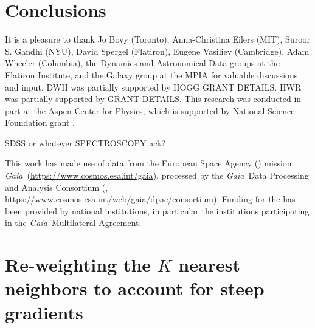 \documentclass[modern]{aastex63}
\newcommand{\gaia}{\textsl{Gaia}}
\newcommand{\apogee}{\acronym{APOGEE}}
\newcommand{\sdss}{\acronym{SDSS}}
\begin{document}

\section{Conclusions}
\label{sec:conclusions}



\acknowledgments
It is a pleasure to thank
  Jo Bovy (Toronto),
  Anna-Christina Eilers (MIT),
  Suroor S. Gandhi (NYU),
  David Spergel (Flatiron),
  Eugene Vasiliev (Cambridge),
  Adam Wheeler (Columbia),
  the Dynamics and Astronomical Data groups at the Flatiron Institute,
  and the Galaxy group at the MPIA
for valuable discussions and input.
DWH was partially supported by HOGG GRANT DETAILS.
HWR was partially supported by GRANT DETAILS.
This research was conducted in part at the Aspen Center for Physics,
which is supported by National Science Foundation grant .

SDSS or whatever SPECTROSCOPY ack?

This work has made use of data from the European Space Agency ()
mission \gaia\ (\url{https://www.cosmos.esa.int/gaia}), processed by the \gaia\
Data Processing and Analysis Consortium (,
\url{https://www.cosmos.esa.int/web/gaia/dpac/consortium}). Funding for the
\acronym{DPAC}
has been provided by national institutions, in particular the institutions
participating in the \gaia\ Multilateral Agreement.



\appendix

\section{Re-weighting the $K$ nearest neighbors to account for steep gradients}
\label{app:knn-weights}
\end{document}
